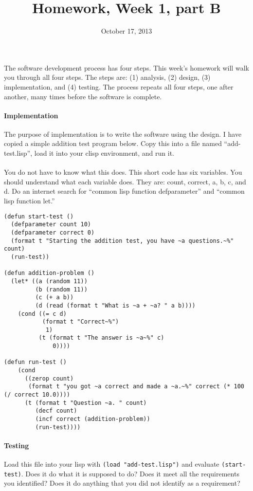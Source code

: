 \documentclass{article}
\title{Homework, Week 1, part B}
\date{October 17, 2013}
\begin{document}
\maketitle{}

\paragraph{}The software development process has four steps. This week's homework will walk you through all four steps. The steps are: (1) analysis, (2) design, (3) implementation, and (4) testing. The process repeats all four steps, one after another, many times before the software is complete.

\paragraph{Implementation}The purpose of implementation is to write the software using the design. I have copied a simple addition test program below. Copy this into a file named ``add-test.lisp'', load it into your clisp environment, and run it.

\paragraph{}You do not have to know what this does. This short code has six variables. You should understand what each variable does. They are: count, correct, a, b, c, and d. Do an internet search for ``common lisp function defparameter'' and ``common lisp function let.''

\lstset{language=Lisp,numbers=left,keepspaces=true,basicstyle=\small,numberstyle=\tiny,showstringspaces=false,breaklines=true}
\begin{lstlisting}
(defun start-test ()
  (defparameter count 10)
  (defparameter correct 0)
  (format t "Starting the addition test, you have ~a questions.~%" count)
  (run-test))

(defun addition-problem ()
  (let* ((a (random 11))
         (b (random 11))
         (c (+ a b))
         (d (read (format t "What is ~a + ~a? " a b))))
    (cond ((= c d)
           (format t "Correct~%")
            1)
          (t (format t "The answer is ~a~%" c)
              0))))

(defun run-test ()
    (cond 
      ((zerop count)
       (format t "you got ~a correct and made a ~a.~%" correct (* 100 (/ correct 10.0))))
      (t (format t "Question ~a. " count)
         (decf count)
         (incf correct (addition-problem))
         (run-test))))
\end{lstlisting}

\paragraph{Testing}Load this file into your lisp with \texttt{(load "add-test.lisp")} and evaluate \texttt{(start-test)}. Does it do what it is supposed to do? Does it meet all the requirements you identified? Does it do anything that you did not identify as a requirement?
\end{document}
